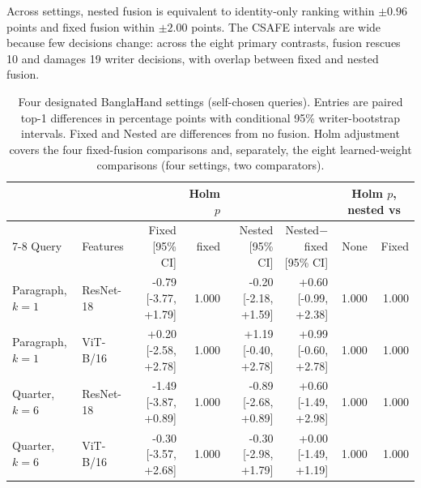 \documentclass[10pt,a4paper]{article}
\begin{document}
Across settings, nested fusion is equivalent to identity-only ranking within $\pm0.96$ points and fixed fusion within $\pm2.00$ points. The CSAFE intervals are wide because few decisions change: across the eight primary contrasts, fusion rescues 10 and damages 19 writer decisions, with overlap between fixed and nested fusion.

\begin{table}[ht]
\caption{Four designated BanglaHand settings (self-chosen queries). Entries are paired top-1 differences in percentage points with conditional 95\% writer-bootstrap intervals. Fixed and Nested are differences from no fusion. Holm adjustment covers the four fixed-fusion comparisons and, separately, the eight learned-weight comparisons (four settings, two comparators).}\label{tab:designated}
\centering\footnotesize\setlength{\tabcolsep}{2.2pt}
\begin{tabular}{llrrrrrr}\toprule
 & & & Holm $p$ & & & \multicolumn{2}{c}{Holm $p$, nested vs}\\\cmidrule(lr){7-8}
Query & Features & Fixed [95\% CI] & fixed & Nested [95\% CI] & Nested$-$fixed [95\% CI] & None & Fixed\\\midrule
Paragraph, $k=1$ & ResNet-18 & -0.79 [-3.77, +1.79] & 1.000 & -0.20 [-2.18, +1.59] & +0.60 [-0.99, +2.38] & 1.000 & 1.000 \\
Paragraph, $k=1$ & ViT-B/16 & +0.20 [-2.58, +2.78] & 1.000 & +1.19 [-0.40, +2.78] & +0.99 [-0.60, +2.78] & 1.000 & 1.000 \\
Quarter, $k=6$ & ResNet-18 & -1.49 [-3.87, +0.89] & 1.000 & -0.89 [-2.68, +0.89] & +0.60 [-1.49, +2.98] & 1.000 & 1.000 \\
Quarter, $k=6$ & ViT-B/16 & -0.30 [-3.57, +2.68] & 1.000 & -0.30 [-2.98, +1.79] & +0.00 [-1.49, +1.19] & 1.000 & 1.000 \\
\bottomrule
\end{tabular}
\end{table}
\end{document}

